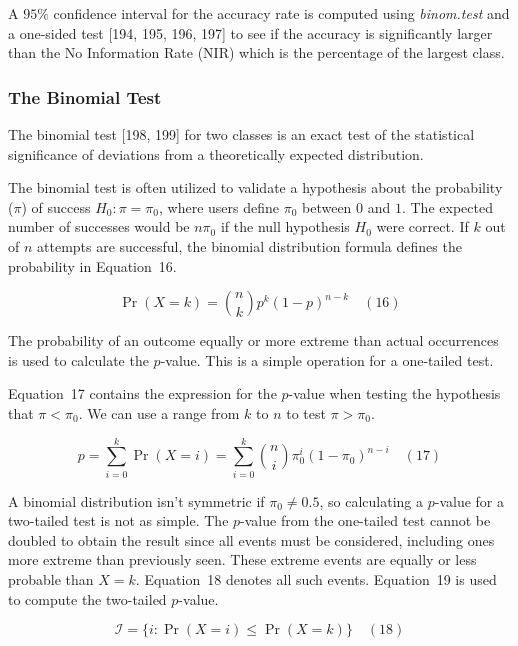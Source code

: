\documentclass[sn-mathphys-num]{sn-jnl}%
\begin{document}
A $95\%$ confidence interval for the accuracy rate is computed using \textit{binom.test} and a one-sided test [194, 195, 196, 197] to see if the accuracy is significantly larger than the No Information Rate (NIR) which is the percentage of the largest class.

\subsubsection{The Binomial Test}

The binomial test [198, 199] for two classes is an exact test of the statistical significance of deviations from a theoretically expected distribution.

The binomial test is often utilized to validate a hypothesis about the probability ($\pi$) of success $H_{0}\colon \pi =\pi_{0}$, where users define $\pi_{0}$ between $0$ and $1$. The expected number of successes would be $n\pi_{0}$ if the null hypothesis $H_{0}$ were correct. If $k$ out of $n$ attempts are successful, the binomial distribution formula defines the probability in Equation~16.

\begin{equation}
	\Pr(X=k)={\binom{n}{k}}p^{k}(1-p)^{n-k}
	\quad\left(16\right)
\end{equation}

The probability of an outcome equally or more extreme than actual occurrences is used to calculate the $p$-value. This is a simple operation for a one-tailed test. 

Equation~17 contains the expression for the $p$-value when testing the hypothesis that $\pi <\pi_{0}$. We can use a range from $k$ to $n$ to test $\pi >\pi_{0}$.

\begin{equation}
	p=\sum_{i=0}^{k}\Pr(X=i)=\sum_{i=0}^{k}{\binom{n}{i}}\pi_{0}^{i}(1-\pi_{0})^{n-i}
	\quad\left(17\right)
\end{equation}

A binomial distribution isn't symmetric if $\pi_{0}\neq 0.5$, so calculating a $p$-value for a two-tailed test is not as simple. The $p$-value from the one-tailed test cannot be doubled to obtain the result since all events must be considered, including ones more extreme than previously seen. These extreme events are equally or less probable than $X=k$. Equation~18 denotes all such events. Equation~19 is used to compute the two-tailed $p$-value.

\begin{equation}
	{\mathcal{I}}=\{i\colon \Pr(X=i)\leq \Pr(X=k)\}
	\quad\left(18\right)
\end{equation}
\end{document}

